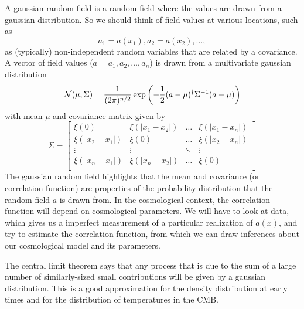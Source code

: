 A gaussian random field is a random field where the values are drawn from a gaussian distribution.
So we should think of field values at various locations, such as 
\begin{equation}a_1 = a(x_1), a_2 = a(x_2), \dots, \end{equation}
as (typically) non-independent random variables that are related by a covariance.  A vector of field values ($a = a_1,a_2,\dots,a_n$) is drawn from a multivariate gaussian distribution
\begin{equation}
  {\cal N}(\mu, \Sigma) = \frac{1}{(2\pi)^{n/2}} \exp \left( -\frac{1}{2} (a - \mu)^\dag \Sigma^{-1} (a-\mu) \right)
\end{equation}
with mean $\mu$ and covariance matrix given by
\begin{equation}
  \Sigma = \left[ \begin{array}{cccc}
    \xi(0) & \xi(|x_1-x_2|) & \dots & \xi(|x_1-x_n|) \\
    \xi(|x_2-x_1|) & \xi(0) & \dots & \xi(|x_2-x_n|) \\
    \vdots & \vdots & \ddots & \vdots \\
    \xi(|x_n-x_1|) & \xi(|x_n-x_2|) & \dots & \xi(0) \\    
    \end{array} \right]
\end{equation}
The gaussian random field highlights that the mean and covariance (or correlation function) are properties of the probability distribution that the random field $a$ is drawn from.  In the cosmological context, the correlation function will depend on cosmological parameters.  We will have to look at data, which gives us a imperfect measurement of a particular realization of $a(x)$, and try to estimate the correlation function, from which we can draw inferences about our cosmological model and its parameters.

The central limit theorem says that any process that is due to the sum of a large number of similarly-sized small contributions will be given by a gaussian distribution.  This is a good approximation for the density distribution at early times and for the distribution of temperatures in the CMB.

